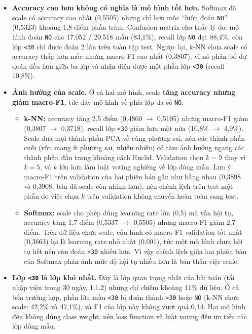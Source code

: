 \documentclass[a4paper]{report}
\begin{document}
\begin{itemize}
  \item \textbf{Accuracy cao hơn không có nghĩa là mô hình tốt hơn.} Softmax đã scale có accuracy cao nhất (0,5505) nhưng chỉ hơn mốc “luôn đoán \texttt{NO}” (0,5323) khoảng 1,8 điểm phần trăm. Confusion matrix cho thấy lý do: mô hình đoán \texttt{NO} cho 17.052 / 20.518 mẫu (83,1\%), recall lớp \texttt{NO} đạt 88,4\%, còn lớp \texttt{<30} chỉ được đoán 2 lần trên toàn tập test. Ngược lại, k-NN chưa scale có accuracy thấp hơn mốc nhưng macro-F1 cao nhất (0,3807), vì nó phân bố dự đoán đều hơn giữa ba lớp và nhận diện được một phần lớp \texttt{<30} (recall 10,8\%).

  \item \textbf{Ảnh hưởng của scale.} Ở cả hai mô hình, scale \textbf{tăng accuracy nhưng giảm macro-F1}, tức đẩy mô hình về phía lớp đa số \texttt{NO}.

\begin{itemize}
  \item \textbf{k-NN:} accuracy tăng 2,5 điểm (0,4860 $\rightarrow$ 0,5105) nhưng macro-F1 giảm (0,3807 $\rightarrow$ 0,3718), recall lớp \texttt{<30} giảm hơn một nửa (10,8\% $\rightarrow$ 4,9\%). Scale đưa mọi thành phần PCA về cùng phương sai, nên các thành phần cuối (vốn mang ít phương sai, nhiều nhiễu) có tầm ảnh hưởng ngang các thành phần đầu trong khoảng cách Euclid. Validation chọn $k = 9$ thay vì $k = 5$, và $k$ lớn hơn làm luật voting nghiêng về lớp đông mẫu. Lưu ý macro-F1 trên validation của hai phiên bản gần như bằng nhau (0,3898 và 0,3908, bản đã scale còn nhỉnh hơn), nên chênh lệch trên test một phần do việc chọn $k$ trên validation không chuyển hoàn toàn sang test.
  \item \textbf{Softmax:} scale cho phép dùng learning rate lớn (0,5) mà vẫn hội tụ, accuracy tăng 1,7 điểm (0,5337 $\rightarrow$ 0,5505) nhưng macro-F1 giảm 2,7 điểm. Trên dữ liệu chưa scale, cấu hình có macro-F1 validation tốt nhất (0,3663) lại là learning rate nhỏ nhất (0,001), tức một mô hình chưa hội tụ hết nên còn đoán \texttt{>30} nhiều hơn. Vì vậy chênh lệch giữa hai phiên bản của Softmax phản ánh mức độ hội tụ nhiều hơn là bản thân việc scale.
\end{itemize}

  \item \textbf{Lớp \texttt{<30} là lớp khó nhất.} Đây là lớp quan trọng nhất của bài toán (tái nhập viện trong 30 ngày, 1.1.2) nhưng chỉ chiếm khoảng 11\% dữ liệu. Ở cả bốn trường hợp, phần lớn mẫu \texttt{<30} bị đoán thành \texttt{>30} hoặc \texttt{NO} (k-NN chưa scale: 42,2\% và 47,1\%), và F1 của lớp này không vượt quá 0,14. Hai mô hình đều không dùng class weight, nên loss function và luật voting đều ưu tiên các lớp đông mẫu.


\end{itemize}
\end{document}
